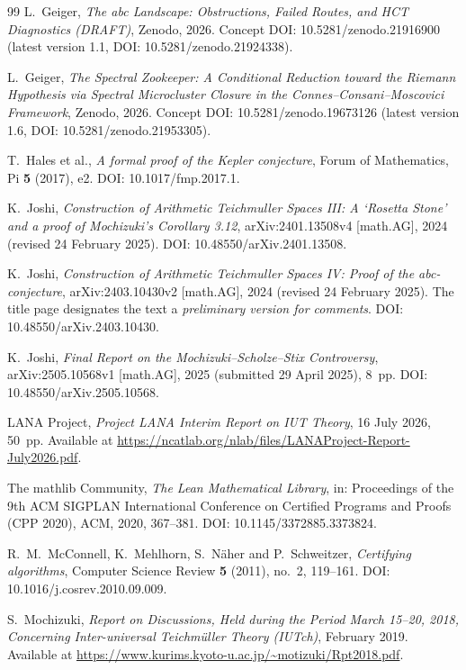 \documentclass[11pt,a4paper]{article}
\begin{document}
\begin{thebibliography}{99}
L.~Geiger,
\emph{The abc Landscape: Obstructions, Failed Routes, and HCT
Diagnostics (DRAFT)},
Zenodo, 2026.
Concept DOI: 10.5281/zenodo.21916900
(latest version 1.1, DOI: 10.5281/zenodo.21924338).

L.~Geiger,
\emph{The Spectral Zookeeper: A Conditional Reduction toward the
Riemann Hypothesis via Spectral Microcluster Closure in the
Connes--Consani--Moscovici Framework},
Zenodo, 2026.
Concept DOI: 10.5281/zenodo.19673126
(latest version 1.6, DOI: 10.5281/zenodo.21953305).

T.~Hales et al.,
\emph{A formal proof of the Kepler conjecture},
Forum of Mathematics, Pi \textbf{5} (2017), e2.
DOI: 10.1017/fmp.2017.1.

K.~Joshi,
\emph{Construction of Arithmetic Teichmuller Spaces III: A `Rosetta
Stone' and a proof of Mochizuki's Corollary 3.12},
arXiv:2401.13508v4 [math.AG], 2024 (revised 24 February 2025).
DOI: 10.48550/arXiv.2401.13508.

K.~Joshi,
\emph{Construction of Arithmetic Teichmuller Spaces IV: Proof of the
abc-conjecture},
arXiv:2403.10430v2 [math.AG], 2024 (revised 24 February 2025).
The title page designates the text a \emph{preliminary version for
comments}.
DOI: 10.48550/arXiv.2403.10430.

K.~Joshi,
\emph{Final Report on the Mochizuki--Scholze--Stix Controversy},
arXiv:2505.10568v1 [math.AG], 2025 (submitted 29 April 2025), 8~pp.
DOI: 10.48550/arXiv.2505.10568.

LANA Project,
\emph{Project LANA Interim Report on IUT Theory},
16 July 2026, 50~pp.
Available at
\url{https://ncatlab.org/nlab/files/LANAProject-Report-July2026.pdf}.

The mathlib Community,
\emph{The Lean Mathematical Library},
in: Proceedings of the 9th ACM SIGPLAN International Conference on
Certified Programs and Proofs (CPP 2020), ACM, 2020, 367--381.
DOI: 10.1145/3372885.3373824.

R.~M.~McConnell, K.~Mehlhorn, S.~Näher and P.~Schweitzer,
\emph{Certifying algorithms},
Computer Science Review \textbf{5} (2011), no.~2, 119--161.
DOI: 10.1016/j.cosrev.2010.09.009.

S.~Mochizuki,
\emph{Report on Discussions, Held during the Period March 15--20, 2018,
Concerning Inter-universal Teichmüller Theory (IUTch)},
February 2019.
Available at
\url{https://www.kurims.kyoto-u.ac.jp/~motizuki/Rpt2018.pdf}.


\end{thebibliography}
\end{document}
